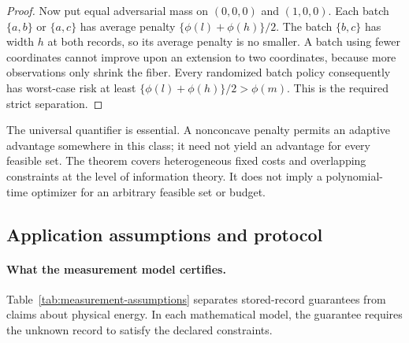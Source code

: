 \documentclass[12pt]{article}
\begin{document}
\begin{proof}
Now put equal adversarial mass on $(0,0,0)$ and $(1,0,0)$.
Each batch $\{a,b\}$ or $\{a,c\}$ has average penalty
$\{\phi(l)+\phi(h)\}/2$. The batch $\{b,c\}$ has width $h$ at both
records, so its average penalty is no smaller. A batch using fewer
coordinates cannot improve upon an extension to two coordinates,
because more observations only shrink the fiber. Every randomized
batch policy consequently has worst-case risk at least
$\{\phi(l)+\phi(h)\}/2>\phi(m)$. This is the required strict separation.
\end{proof}

The universal quantifier is essential. A nonconcave penalty permits an
adaptive advantage somewhere in this class; it need not yield an
advantage for every feasible set. The theorem covers heterogeneous fixed
costs and overlapping constraints at the level of information theory.
It does not imply a polynomial-time optimizer for an arbitrary feasible
set or budget.


\subsection{Application assumptions and protocol}
\paragraph{What the measurement model certifies.}
Table~\ref{tab:measurement-assumptions} separates stored-record guarantees
from claims about physical energy. In each mathematical model, the guarantee
requires the unknown record to satisfy the declared constraints.
\end{document}

